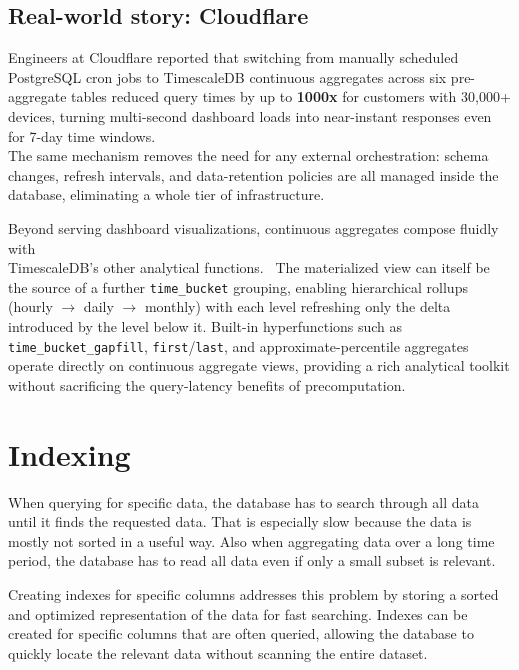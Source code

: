 \subsection{Real-world story: Cloudflare}

Engineers at Cloudflare reported that switching from manually scheduled
PostgreSQL cron jobs to TimescaleDB continuous aggregates across six
pre-aggregate tables reduced query times by up to \textbf{1000x} for customers
with 30{,}000+ devices, turning multi-second dashboard loads into near-instant
responses even for 7-day time windows.\\\cite{TimescaleDB:05} The same
mechanism removes the need for any external orchestration: schema changes,
refresh intervals, and data-retention policies are all managed inside the
database, eliminating a whole tier of infrastructure.\cite{TimescaleDB:05}



Beyond serving dashboard visualizations, continuous aggregates compose
fluidly with \\ TimescaleDB's other analytical functions.~\cite{TimescaleDB:06}
The materialized view can itself be the source of a further
\texttt{time\_bucket} grouping, enabling hierarchical rollups (hourly $\to$
daily $\to$ monthly) with each level refreshing only the delta introduced by
the level below it. Built-in hyperfunctions such as
\texttt{time\_bucket\_gapfill}, \texttt{first}/\texttt{last}, and
approximate-percentile aggregates operate directly on continuous aggregate
views, providing a rich analytical toolkit without sacrificing the
query-latency benefits of precomputation.\cite{TimescaleDB:06}

\section{Indexing}

When querying for specific data, the database has to search through all data
until it finds the requested data. That is especially slow because the data is
mostly not sorted in a useful way. Also when aggregating data over a long time
period, the database has to read all data even if only a small subset is
relevant.

Creating indexes for specific columns addresses this problem by storing a
sorted and optimized representation of the data for fast searching. Indexes can
be created for specific columns that are often queried, allowing the database
to quickly locate the relevant data without scanning the entire dataset.

